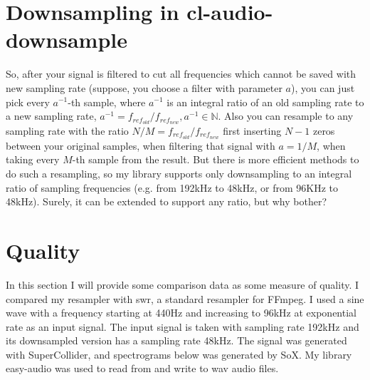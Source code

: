 \documentclass[a4paper,11pt,fleqn]{article}
\begin{document}
\section{Downsampling in cl-audio-downsample}
So, after your signal is filtered to cut all frequencies which cannot be saved with new sampling rate (suppose, you choose a filter with parameter $a$), you can just pick every $a^{-1}$-th sample, where
$a^{-1}$ is an integral ratio of an old sampling rate to a new sampling rate, $a^{-1} = f_{ref_{old}}/f_{ref_{new}}, a^{-1} \in \mathbb{N}$. Also you can resample to any sampling rate with the ratio
$N/M = f_{ref_{old}}/f_{ref_{new}}$ first inserting $N-1$ zeros between your original samples, when filtering that signal with $a=1/M$, when taking every $M$-th sample from the result. But there is more
efficient methods to do such a resampling, so my library supports only downsampling to an integral ratio of sampling frequencies (e.g. from 192kHz to 48kHz, or from 96KHz to 48kHz). Surely, it can be extended
to support any ratio, but why bother?

\section{Quality}
In this section I will provide some comparison data as some measure of quality. I compared my resampler with swr, a standard resampler for FFmpeg. I used a sine wave with a frequency starting at 440Hz and increasing
to 96kHz at exponential rate as an input signal. The input signal is taken with sampling rate 192kHz and its downsampled version has a sampling rate 48kHz. The signal was generated with SuperCollider, and spectrograms
below was generated by SoX. My library easy-audio was used to read from and write to wav audio files.
\end{document}

